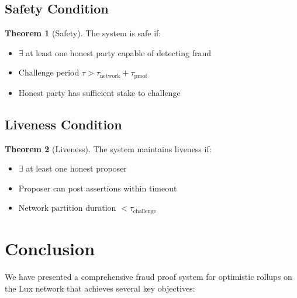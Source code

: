 \documentclass[11pt,a4paper]{article}
\theoremstyle{definition}
\newtheorem{theorem}{Theorem}[section]
\begin{document}
\subsection{Safety Condition}

\begin{theorem}[Safety]
The system is safe if:
\begin{itemize}
    \item $\exists$ at least one honest party capable of detecting fraud
    \item Challenge period $\tau > \tau_{\text{network}} + \tau_{\text{proof}}$
    \item Honest party has sufficient stake to challenge
\end{itemize}
\end{theorem}

\subsection{Liveness Condition}

\begin{theorem}[Liveness]
The system maintains liveness if:
\begin{itemize}
    \item $\exists$ at least one honest proposer
    \item Proposer can post assertions within timeout
    \item Network partition duration $< \tau_{\text{challenge}}$
\end{itemize}
\end{theorem}

\section{Conclusion}

We have presented a comprehensive fraud proof system for optimistic rollups on the Lux network that achieves several key objectives:
\end{document}
